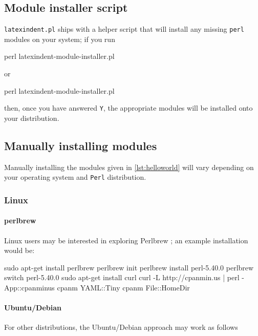 \documentclass[10pt]{article}
\begin{document}
 \subsection{Module installer script}\label{sec:module-installer}
   \texttt{latexindent.pl} ships with a
  helper script that will install any missing \texttt{perl} modules on your system; if you
  run

  \begin{commandshell}
perl latexindent-module-installer.pl
\end{commandshell}

  or
  \begin{dosprompt}
perl latexindent-module-installer.pl
 \end{dosprompt}
  then, once you have answered \texttt{Y}, the appropriate modules will be installed onto
  your distribution.

 \subsection{Manually installing modules}\label{sec:manual-module-instal}
  Manually installing the modules given in \cref{lst:helloworld} will vary depending on
  your operating system and \texttt{Perl} distribution.

 \subsubsection{Linux}
  \paragraph{perlbrew}
   Linux users may be interested in exploring Perlbrew \cite{perlbrew}; an example
   installation would be:

   \begin{commandshell}
sudo apt-get install perlbrew
perlbrew init
perlbrew install perl-5.40.0
perlbrew switch perl-5.40.0
sudo apt-get install curl
curl -L http://cpanmin.us | perl - App::cpanminus
cpanm YAML::Tiny
cpanm File::HomeDir
\end{commandshell}


  \paragraph{Ubuntu/Debian}
   For other distributions, the Ubuntu/Debian approach may work as follows
\end{document}
